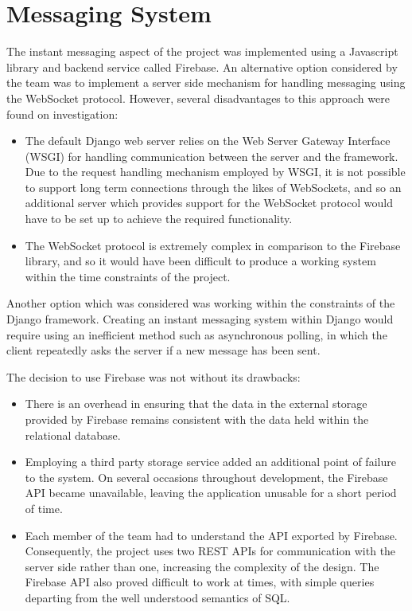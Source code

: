 \documentclass[a4paper]{l3proj}
\begin{document}
\section{Messaging System}
\label{messagingSystem}

The instant messaging aspect of the project was implemented using a Javascript library and backend service called Firebase. An alternative option considered by the team was to implement a server side mechanism for handling messaging using the WebSocket protocol. However, several disadvantages to this approach were found on investigation:

\begin{itemize}
\item The default Django web server relies on the Web Server Gateway Interface (WSGI) for handling communication between the server and the framework. Due to the request handling mechanism employed by WSGI, it is not possible to support long term connections through the likes of WebSockets, and so an additional server which provides support for the WebSocket protocol would have to be set up to achieve the required functionality.
\item The WebSocket protocol is extremely complex in comparison to the Firebase library, and so it would have been difficult to produce a working system within the time constraints of the project.
\end{itemize}

Another option which was considered was working within the constraints of the Django framework. Creating an instant messaging system within Django would require using an inefficient method such as asynchronous polling, in which the client repeatedly asks the server if a new message has been sent.

The decision to use Firebase was not without its drawbacks:
\begin{itemize}
\item There is an overhead in ensuring that the data in the external storage provided by Firebase remains consistent with the data held within the relational database.
\item Employing a third party storage service added an additional point of failure to the system. On several occasions throughout development, the Firebase API became unavailable, leaving the application unusable for a short period of time.
\item Each member of the team had to understand the API exported by Firebase. Consequently, the project uses two REST APIs for communication with the server side rather than one, increasing the complexity of the design. The Firebase API also proved difficult to work at times, with simple queries departing from the well understood semantics of SQL.
\end{itemize}
\end{document}
